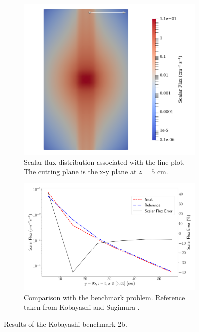 \begin{figure}[H]
    \centering
    \begin{subfigure}[b]{0.4\textwidth}
        \centering
        \includegraphics[width=\textwidth]{images/verification/sn_kobayashi/2/kobayashi_2b_flux_map.png}
        \caption{Scalar flux distribution associated with the line plot. The cutting plane is the x-y plane at $z = 5\text{ cm}$.}
        \label{fig:verification:sn_kobayashi_2b:flux}
    \end{subfigure}
    \hfill
    \begin{subfigure}[b]{0.59\textwidth}
        \centering
        \includegraphics[width=\textwidth]{images/verification/sn_kobayashi/2/kobayashi_2b.png}
        \caption{Comparison with the benchmark problem. Reference taken from Kobayashi and Sugimura \cite{kobayashi_benchmarks}.}
        \label{fig:verification:sn_kobayashi_2b:line_plot}
    \end{subfigure}
    \caption{Results of the Kobayashi benchmark 2b.}
    \label{fig:verification:sn_kobayashi_2b}
\end{figure}

